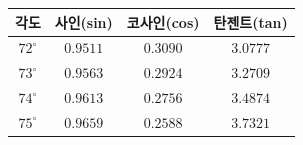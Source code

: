 {\renewcommand{\arraystretch}{1.45}\small
\begin{tabular}{|c|c|c|c|}
\hline
각도 & 사인(sin) & 코사인(cos) & 탄젠트(tan) \\ \hline
$72^\circ$ & $0.9511$ & $0.3090$ & $3.0777$ \\ \hline
$73^\circ$ & $0.9563$ & $0.2924$ & $3.2709$ \\ \hline
$74^\circ$ & $0.9613$ & $0.2756$ & $3.4874$ \\ \hline
$75^\circ$ & $0.9659$ & $0.2588$ & $3.7321$ \\ \hline
\end{tabular}}
